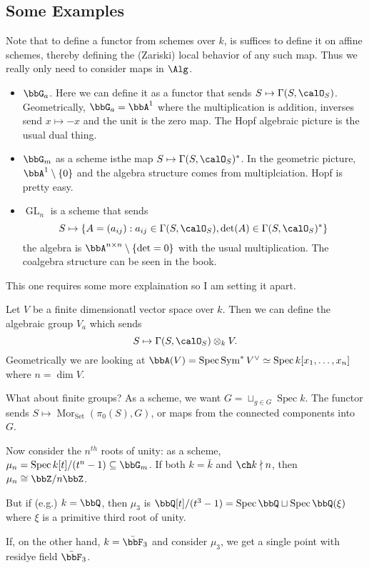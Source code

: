 \documentclass[12pt]{article}
\DeclareMathOperator{\1}{\mathbbm{1}}
\DeclareMathOperator{\GL}{GL}
\DeclareMathOperator{\Sym}{Sym}
\DeclareMathOperator{\Spec}{Spec}
\begin{document}
\subsection{Some Examples}
\begin{rmk}
	Note that to define a functor from schemes over $k$, is suffices to define it on affine schemes, thereby defining 
	the (Zariski) local behavior of any such map. Thus we really only need to consider maps in $\Alg$.
\end{rmk}
\begin{itemize}
	\item $\bbG_a$. Here we can define it as a functor that sends $S\mapsto\Gamma(S,\calO_S)$. Geometrically, $\bbG_a=\bbA^1$ where the multiplication is addition, inverses send $x\mapsto -x$ and the unit is the zero map.
	The Hopf algebraic picture is the usual dual thing.
	\item $\bbG_m$ as a scheme isthe map $S\mapsto \Gamma(S,\calO_S)^\ast$. In the geometric picture, $\bbA^1\setminus\{0\}$ and the algebra structure comes from multiplciation. Hopf is pretty easy.
	\item $\GL_n$ is a scheme that sends
	\[S\mapsto \left\{A=(a_{ij}): a_{ij}\in\Gamma(S,\calO_S), \det(A)\in\Gamma(S,\calO_S)^\ast\right\}\]
	the algebra is $\bbA^{n\times n}\setminus \{\det = 0\}$ with the usual multiplication. The coalgebra structure can be seen in the book.
\end{itemize}
This one requires some more explaination so I am setting it apart.
\begin{ex}
	Let $V$ be a finite dimensionatl vector space over $k$. Then we can define the algebraic group $V_a$ which sends 
	\[S\mapsto \Gamma(S,\calO_S)\otimes_k V.\]
	Geometrically we are looking at $\bbA(V)=\Spec\Sym ^\ast V^\vee\simeq \Spec k[x_1,\dots,x_n]$ where $n=\dim V$.
\end{ex}

What about finite groups? As a scheme, we want $G=\sqcup_{g\in G}\Spec k$. The functor sends $S\mapsto \operatorname{Mor}_{\operatorname{Set}}(\pi_0(S),G)$,
or maps from the connected components into $G$.

\begin{ex}
	Now consider the $n^{th}$ roots of unity: as a scheme, $\mu_n=\Spec k[t]/(t^n-1)\subseteq \bbG_m$.
	If both $k=\bar k$ and $\ch k\nmid n$, then $\mu_n\cong\bbZ/n\bbZ$.

	But if (e.g.) $k=\bbQ$, then $\mu_3$ is $\bbQ[t]/(t^3-1)=\Spec\bbQ\sqcup \Spec\bbQ(\xi)$ where $\xi$ is a primitive third root of unity.

	If, on the other hand, $k=\bar \bbF_3$ and consider $\mu_3$, we get a single point with residye field $\bar\bbF_3$.
\end{ex}
\end{document}
